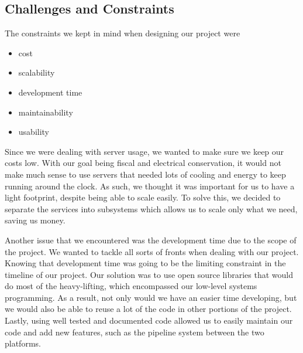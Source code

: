 \documentclass[conference]{IEEEtran}
\begin{document}



\subsection{Challenges and Constraints}
The constraints we kept in mind when designing our project were
\begin{itemize}
    \item cost
    \item scalability
    \item development time
    \item maintainability
    \item usability
\end{itemize}

Since we were dealing with server usage, we wanted to make sure we keep our costs low. With our goal being fiscal and electrical conservation, it would not make much sense to use servers that needed lots of cooling and energy to keep running around the clock. As such, we thought it was important for us to have a light footprint, despite being able to scale easily. To solve this, we decided to separate the services into subsystems which allows us to scale only what we need, saving us money.

Another issue that we encountered was the development time due to the scope of the project. We wanted to tackle all sorts of fronts when dealing with our project. Knowing that development time was going to be the limiting constraint in the timeline of our project. Our solution was to use open source libraries that would do most of the heavy-lifting, which encompassed our low-level systems programming. As a result, not only would we have an easier time developing, but we would also be able to reuse a lot of the code in other portions of the project. Lastly, using well tested and documented code allowed us to easily maintain our code and add new features, such as the pipeline system between the two platforms.
\end{document}
